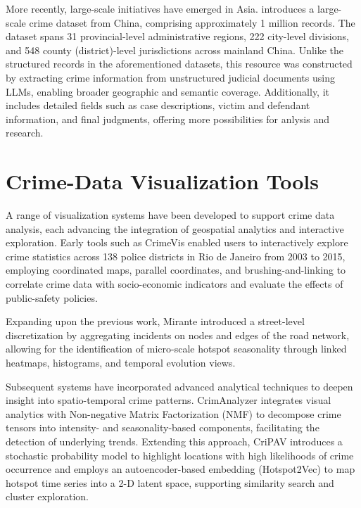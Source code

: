 More recently, large-scale initiatives have emerged in Asia. \cite{Zhang2025CrimeDatasetChina} introduces a large-scale crime dataset from China, comprising approximately 1 million records. The dataset spans 31 provincial-level administrative regions, 222 city-level divisions, and 548 county (district)-level jurisdictions across mainland China. Unlike the structured records in the aforementioned datasets, this resource was constructed by extracting crime information from unstructured judicial documents using LLMs, enabling broader geographic and semantic coverage. Additionally, it includes detailed fields such as case descriptions, victim and defendant information, and final judgments, offering more possibilities for anlysis and research.



\section{Crime-Data Visualization Tools}


A range of visualization systems have been developed to support crime data analysis, each advancing the integration of geospatial analytics and interactive exploration. Early tools such as CrimeVis \cite{Silva2017CrimeVisAI} enabled users to interactively explore crime statistics across 138 police districts in Rio de Janeiro from 2003 to 2015, employing coordinated maps, parallel coordinates, and brushing-and-linking to correlate crime data with socio-economic indicators and evaluate the effects of public-safety policies. 

Expanding upon the previous work, Mirante \cite{Garcia2020MiranteAV} introduced a street-level discretization by aggregating incidents on nodes and edges of the road network, allowing for the identification of micro-scale hotspot seasonality through linked heatmaps, histograms, and temporal evolution views.

Subsequent systems have incorporated advanced analytical techniques to deepen insight into spatio-temporal crime patterns. CrimAnalyzer \cite{Garcia2021CrimAnalyzer} integrates visual analytics with Non-negative Matrix Factorization (NMF) to decompose crime tensors into intensity- and seasonality-based components, facilitating the detection of underlying trends. Extending this approach, CriPAV \cite{Garcia2022CriPAV} introduces a stochastic probability model to highlight locations with high likelihoods of crime occurrence and employs an autoencoder-based embedding (Hotspot2Vec) to map hotspot time series into a 2-D latent space, supporting similarity search and cluster exploration. 

